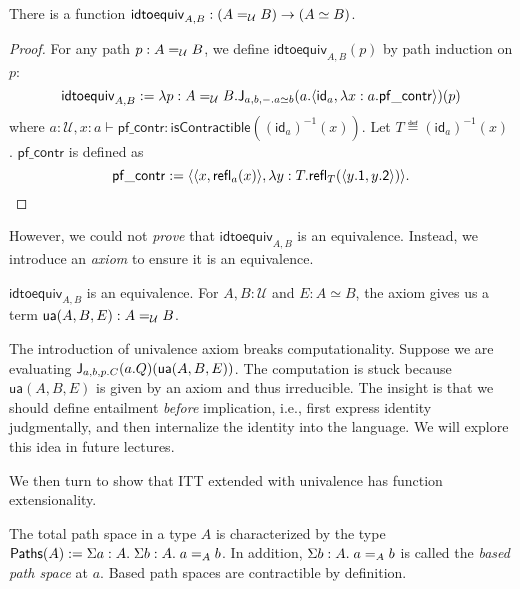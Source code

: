 \documentclass{article}
\newcommand{\calU}{\mathcal{U}}
\begin{document}
\begin{lemma}
	There is a function $\mathsf{idtoequiv}_{A,B} : (\Ideq{\calU}{A}{B}) \to (A 
	\simeq 
	B)$.
\end{lemma}
\begin{proof}
	For any path $p : \Ideq{\calU}{A}{B}$, we define 
	$\mathsf{idtoequiv}_{A,B}(p)$ 
	by path induction on $p$:
	\[
	\mathsf{idtoequiv}_{A,B} \eqdef \lambda p : \Ideq{\calU}{A}{B}. 
	\Idelim{a,b,-. a 
	\simeq b}{a.  \langle \mathsf{id}_a,  
	\lambda x : a. \mathsf{pf\_contr}  \rangle 
	}{p}
	\]
	where $a : \calU, x : a \vdash \mathsf{pf\_contr} : 
	\mathsf{isContractible}((\mathsf{id}_a)^{-1}(x))$.
	Let $T \eqdef (\mathsf{id}_a)^{-1}(x)$.
	$\mathsf{pf\_contr}$ is defined as
	\[
	\mathsf{pf\_contr} \eqdef \langle  \langle x, 
	\refl{a}{x} \rangle , 
	\lambda y : 
	T.  \refl{T}{ \langle y.\mathsf{1}, y.\mathsf{2}  \rangle   } \rangle.
	\]
\end{proof}

However, we could not \emph{prove} that $\mathsf{idtoequiv}_{A,B}$ is an 
equivalence.
Instead, we introduce an \emph{axiom} to ensure it is an equivalence.

\begin{axiom}[Univalence]
	$\mathsf{idtoequiv}_{A,B}$ is an equivalence.
	For $A,B : \calU$ and $E : A \simeq B$, the axiom gives us a term 
	$\mathsf{ua}(A,B,E) : \Ideq{\calU}{A}{B}$.
\end{axiom}

\begin{remark}
	The introduction of univalence axiom breaks computationality.
	Suppose we are evaluating $\Idelim{a,b,p.C}{a.Q}{\mathsf{ua}(A,B,E)}$.
	The computation is stuck because $\mathsf{ua}(A,B,E)$ is given by an axiom 
	and thus irreducible.
	The insight is that we should define entailment \emph{before} implication, 
	i.e., first express identity judgmentally, and then internalize the identity into 
	the language.
	We will explore this idea in future lectures.
\end{remark}

We then turn to show that ITT extended with univalence has function 
extensionality.

\begin{definition}
	The total path space in a type $A$ is characterized by the type 
	$\mathsf{Paths}(A) \eqdef 
	\hsigtype{a}{A}{\hsigtype{b}{A}{\Ideq{A}{a}{b}}}$.
	In addition, $\hsigtype{b}{A}{\Ideq{A}{a}{b}}$ is called the \emph{based 
	path space} at $a$.
	Based path spaces are contractible by definition.
\end{definition}
\end{document}
